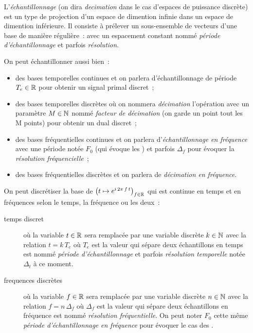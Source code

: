 \begin{definition}
L'\emph{échantillonnage} (on dira \emph{decimation} dans le cas
d'espaces de puissance discrète) est un type de projection d'un espace
de dimention infinie dans un espace de dimention inférieure. Il
consiste à prélever un sous-ensemble de vecteurs d'une base de manière
régulière~: avec un espacement constant nommé \emph{période
  d'échantillonnage} et parfois \emph{résolution}.
\end{definition}

\begin{remarque}
  On peut échantillonner aussi bien~:
  \begin{itemize}
  \item des bases temporelles continues et on parlera
    d'échantillonnage de période $T_e\in\mathbb{R}$ pour obtenir un signal
    primal discret~;
  \item des bases temporelles discrètes où on nommera
    \emph{décimation} l'opération avec un paramètre $M\in\mathbb{N}$ nommé
    \emph{facteur de décimation} (on garde un point tout les M points)
    pour obtenir un dual discret~;
  \item des bases fréquentielles continues et on parlera
    d'\emph{échantillonnage en fréquence} avec une période notée $F_0$
    (qui évoque les \sdf{}) et parfois $\Delta_f$ pour évoquer la
    \emph{résolution fréquencielle}~;
  \item des bases fréquentielles discrètes et on parlera de
    \emph{décimation en fréquence}.
\end{itemize}
\end{remarque}

On peut discrétiser la base de \Fourier{}
$\left(t\mapsto e^{i\,2\pi\,f\,t}\right)_{f\in\mathbb{R}}$ qui est continue en temps et en fréquences selon le temps, la fréquence ou les deux~:
\begin{description}
\item[temps discret] où la variable $t\in\mathbb{R}$ sera remplacée par une
  variable discrète $k\in\mathbb{N}$ avec la relation $t=k\,T_e$ où $T_e$ est
  la valeur qui sépare deux échantillons en temps est nommé
  \emph{période d'échantillonnage} et parfois \emph{résolution
    temporelle} notée $\Delta_t$ à ce moment.
\item[frequences discrètes] où la variable $f\in\mathbb{R}$ sera remplacée par
  une variable discrète $n\in\mathbb{N}$ avec la relation $f=n\,\Delta_f$ où
  $\Delta_f$ est la valeur qui sépare deux échantillons en fréquence
  est nommé \emph{résolution fréquentielle}. On peut noter $F_0$ cette
  même \emph{période d'échantillonnage en fréquence} pour évoquer le
  cas des \sdf.
\end{description}

